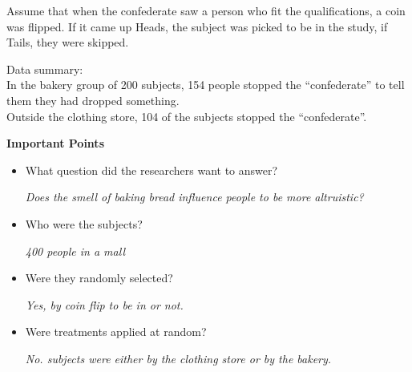 Assume that when the confederate saw a person who fit the qualifications, a
coin was flipped. If it came up Heads, the subject was picked to be in
the study, if Tails, they were skipped.

Data summary:\\
 In the bakery group of 200 subjects, 154 people stopped the ``confederate'' to tell
 them they had dropped something.\\
 Outside the clothing store, 104 of the subjects stopped the
 ``confederate''.  
\begin{center}
  {\large\bf Important Points}
\end{center}


\begin{itemize}
\item  What question did the researchers want to answer?
\begin{students}
 \vspace{.8cm}
\end{students}

\begin{key}
{\it Does the smell of baking bread influence people to be more altruistic?}
\end{key}


\item Who were the subjects?
\begin{students}
 \vspace{.8cm}
\end{students}

\begin{key}
{\it 400 people in a mall}
\end{key}


\item Were they randomly selected?
\begin{students}
 \vspace{.8cm}
\end{students}

\begin{key}
{\it Yes, by coin flip to be in or not.}
\end{key}



\item Were treatments applied at random?
\begin{students}
 \vspace{.8cm}
\end{students}

\begin{key}
 {\it No. subjects were either by the clothing store or by the bakery.}
\end{key}


\end{itemize}
